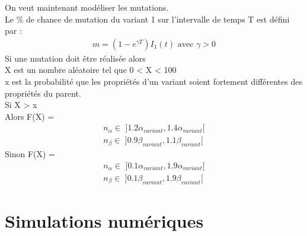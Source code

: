 \documentclass{article}
\begin{document}
\noindent
On veut maintenant modéliser les mutations.\\
Le \% de chance de mutation du variant 1 sur l'intervalle de temps T est défini par :
\begin{align}
    m = (1-e^{\gamma T})I_1(t) \text{ avec }\gamma > \text{0}
\end{align}
\noindent
Si une mutation doit être réalisée alors \\
\noindent
X est un nombre aléatoire tel que 0 < X < 100 \\
x est la probabilité que les propriétés d'un variant soient fortement différentes des propriétés du parent.\\
Si X > x \\
Alors F(X) =
\begin{align}
    n_\alpha \in \text{ ]}1.2\alpha_{variant}, 1.4\alpha_{variant}\text{[}  \\
    n_\beta \in \text{ ]}0.9\beta_{variant}, 1.1\beta_{variant}\text{[}
\end{align}
\noindent
Sinon F(X) = \\
\begin{align}
    n_\alpha \in \text{ ]}0.1\alpha_{variant}, 1.9\alpha_{variant}\text{[} \\
    n_\beta \in \text{ ]}0.1\beta_{variant}, 1.9\beta_{variant}\text{[}
\end{align}


\section{Simulations numériques}
\end{document}
